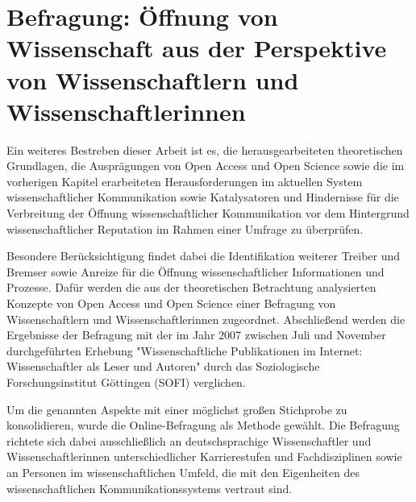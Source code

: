 \chapter{Befragung: Öffnung von Wissenschaft aus der Perspektive von Wissenschaftlern und Wissenschaftlerinnen}

Ein weiteres Bestreben dieser Arbeit ist es, die herausgearbeiteten theoretischen Grundlagen, die Ausprägungen von Open Access und Open Science sowie die im vorherigen Kapitel erarbeiteten Herausforderungen im aktuellen System wissenschaftlicher Kommunikation sowie Katalysatoren und Hindernisse für die Verbreitung der Öffnung wissenschaftlicher Kommunikation vor dem Hintergrund wissenschaftlicher Reputation im Rahmen einer Umfrage zu überprüfen.

Besondere Berücksichtigung findet dabei die Identifikation weiterer Treiber und Bremser sowie Anreize für die Öffnung wissenschaftlicher Informationen und Prozesse. Dafür werden die aus der theoretischen Betrachtung analysierten Konzepte von Open Access und Open Science einer Befragung von Wissenschaftlern und Wissenschaftlerinnen zugeordnet. Abschließend werden die Ergebnisse der Befragung mit der im Jahr 2007 zwischen Juli und November durchgeführten Erhebung "Wissenschaftliche Publikationen im Internet: Wissenschaftler als Leser und Autoren" durch das Soziologische Forschungsinstitut Göttingen (SOFI) \cite{hanekop_2008} verglichen.

Um die genannten Aspekte mit einer möglichst großen Stichprobe zu konsolidieren, wurde die Online-Befragung als Methode gewählt. Die Befragung richtete sich dabei ausschließlich an deutschsprachige Wissenschaftler und Wissenschaftlerinnen unterschiedlicher Karrierestufen und Fachdisziplinen sowie an Personen im wissenschaftlichen Umfeld, die mit den Eigenheiten des wissenschaftlichen Kommunikationssystems vertraut sind.

